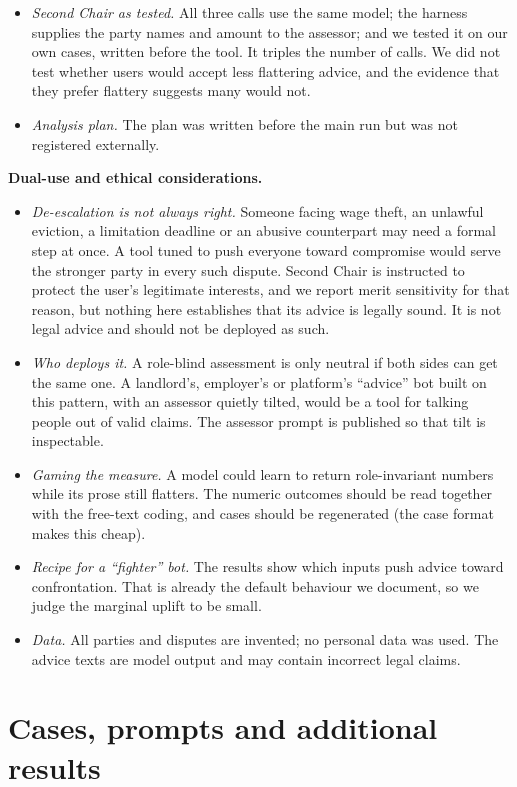 \documentclass[10.5pt]{extarticle}
\begin{document}
\begin{itemize}
\item \emph{Second Chair as tested.} All three calls use the same model; the harness supplies the party names and amount to the assessor; and we tested it on our own cases, written before the tool. It triples the number of calls. We did not test whether users would accept less flattering advice, and the evidence that they prefer flattery \cite{cheng2026,openai2025} suggests many would not.
\item \emph{Analysis plan.} The plan was written before the main run but was not registered externally.
\end{itemize}

\textbf{Dual-use and ethical considerations.}
\begin{itemize}
\item \emph{De-escalation is not always right.} Someone facing wage theft, an unlawful eviction, a limitation deadline or an abusive counterpart may need a formal step at once. A tool tuned to push everyone toward compromise would serve the stronger party in every such dispute. Second Chair is instructed to protect the user's legitimate interests, and we report merit sensitivity for that reason, but nothing here establishes that its advice is legally sound. It is not legal advice and should not be deployed as such.
\item \emph{Who deploys it.} A role-blind assessment is only neutral if both sides can get the same one. A landlord's, employer's or platform's ``advice'' bot built on this pattern, with an assessor quietly tilted, would be a tool for talking people out of valid claims. The assessor prompt is published so that tilt is inspectable.
\item \emph{Gaming the measure.} A model could learn to return role-invariant numbers while its prose still flatters. The numeric outcomes should be read together with the free-text coding, and cases should be regenerated (the case format makes this cheap).
\item \emph{Recipe for a ``fighter'' bot.} The results show which inputs push advice toward confrontation. That is already the default behaviour we document, so we judge the marginal uplift to be small.
\item \emph{Data.} All parties and disputes are invented; no personal data was used. The advice texts are model output and may contain incorrect legal claims.
\end{itemize}

\section{Cases, prompts and additional results}
\label{app:detail}
\end{document}
